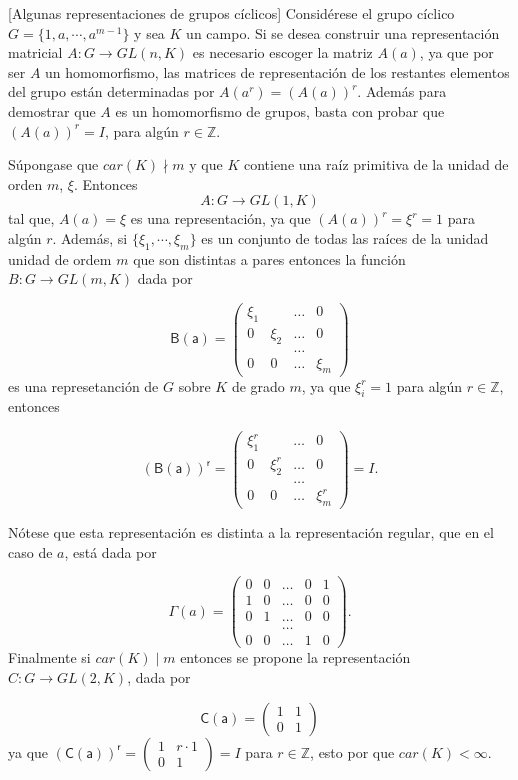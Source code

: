 \begin{ejemplo}\label{rciclica}[Algunas representaciones de grupos cíclicos]
Considérese el grupo cíclico $G = \{1,a, \cdots, a^{m-1} \}$ y sea $K$ un campo. Si se desea construir una representación matricial $A \colon G \to GL(n,K)$ es necesario escoger la matriz $A(a)$, ya que por ser $A$ un homomorfismo, las matrices de representación de los restantes elementos del grupo están determinadas por $A(a^r) = (A(a))^r $. Además para demostrar que $A$ es un homomorfismo de grupos, basta con probar que $(A(a))^r = I$, para algún $r \in \mathds{Z}$.

Súpongase que $car(K) \nmid m$ y que $K$ contiene una raíz primitiva de la unidad de orden $m$,  $\xi$. Entonces 
\[ A \colon G \to GL(1,K) \]  tal que, $A(a)  = \xi$ es una representación, ya que $(A(a))^r = \xi^r = 1$ para algún $r$.  Además, si $\{ \xi_1, \cdots, \xi_m \}$ es un conjunto de todas las raíces de la unidad unidad de ordem $m$ que son distintas a pares entonces la función $B \colon G \to GL(m,K)$ dada por 

\[ \mathsf{B(a)} = \begin{pmatrix}
\xi_1 &  &\dots &  0 \\
0 & \xi_2 & \dots & 0 \\
 & & \dots &  \\
 0 & 0 & \dots & \xi_m
\end{pmatrix} \] es una represetanción de $G$ sobre $K$ de grado $m$, ya que $\xi_i^r = 1$ para algún $r \in \mathds{Z}$, entonces 

\[ \mathsf{(B(a))^r} = \begin{pmatrix}
\xi_1^r &  &\dots &  0 \\
0 & \xi_2^r & \dots & 0 \\
 & & \dots &  \\
 0 & 0 & \dots & \xi_m^r
\end{pmatrix} = I. \]

Nótese que esta representación es distinta a la representación regular, que en el caso de $a$, está dada por 

\[ \mathsf{\Gamma}(a) = \begin{pmatrix}
0 & 0 & \dots & 0 & 1 \\
1 & 0 & \dots & 0 & 0\\
0 & 1 & \dots & 0 & 0\\
 &  &  \dots &  &  \\
 0 & 0 & \dots & 1 & 0
\end{pmatrix}. \]
Finalmente si $car(K) \mid m$ entonces se propone la representación $C \colon G \to GL(2,K)$, dada por

\[ \mathsf{C(a)} = \begin{pmatrix}
1 & 1\\
0 & 1
\end{pmatrix} \] ya que $\mathsf{(C(a))^r} = \begin{pmatrix}
1 & r\cdot 1\\
0 & 1
\end{pmatrix} = I$ para $r \in \mathds{Z}$, esto por que $car(K) < \infty $.
\end{ejemplo} 

